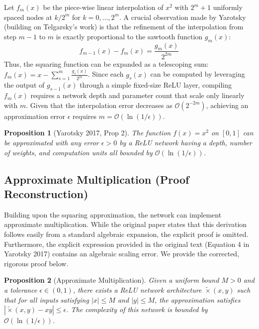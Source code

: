 \documentclass[12pt]{article}
\newtheorem{proposition}{Proposition}
\begin{document}
Let $f_m(x)$ be the piece-wise linear interpolation of $x^2$ with $2^m + 1$ uniformly spaced nodes at $k/2^m$ for $k = 0, \dots, 2^m$. A crucial observation made by Yarotsky (building on Telgarsky's work) is that the refinement of the interpolation from step $m-1$ to $m$ is exactly proportional to the sawtooth function $g_m(x)$:
\begin{equation}
f_{m-1}(x) - f_m(x) = \frac{g_m(x)}{2^{2m}}
\end{equation}
Thus, the squaring function can be expanded as a telescoping sum: $f_m(x) = x - \sum_{s=1}^m \frac{g_s(x)}{2^{2s}}$. Since each $g_s(x)$ can be computed by leveraging the output of $g_{s-1}(x)$ through a simple fixed-size ReLU layer, compiling $f_m(x)$ requires a network depth and parameter count that scale only linearly with $m$. Given that the interpolation error decreases as $\mathcal{O}(2^{-2m})$, achieving an approximation error $\epsilon$ requires $m = \mathcal{O}(\ln(1/\epsilon))$.

\begin{proposition}[Yarotsky 2017, Prop 2]
The function $f(x) = x^2$ on $[0, 1]$ can be approximated with any error $\epsilon > 0$ by a ReLU network having a depth, number of weights, and computation units all bounded by $\mathcal{O}(\ln(1/\epsilon))$.
\end{proposition}

\subsection{Approximate Multiplication (Proof Reconstruction)}
Building upon the squaring approximation, the network can implement approximate multiplication. While the original paper states that this derivation follows easily from a standard algebraic expansion, the explicit proof is omitted. Furthermore, the explicit expression provided in the original text (Equation 4 in Yarotsky 2017) contains an algebraic scaling error. We provide the corrected, rigorous proof below.

\begin{proposition}[Approximate Multiplication]
Given a uniform bound $M > 0$ and a tolerance $\epsilon \in (0,1)$, there exists a ReLU network architecture $\tilde{\times}(x,y)$ such that for all inputs satisfying $|x| \le M$ and $|y| \le M$, the approximation satisfies $|\tilde{\times}(x,y) - xy| \le \epsilon$. The complexity of this network is bounded by $\mathcal{O}(\ln(1/\epsilon))$.
\end{proposition}
\end{document}
